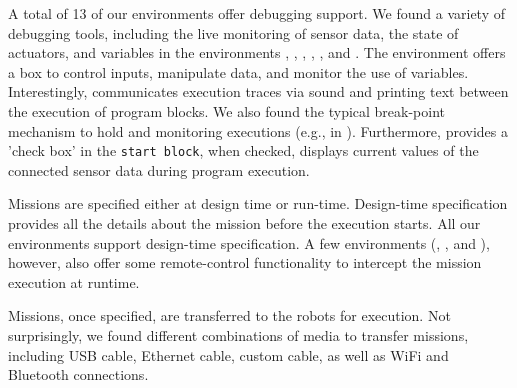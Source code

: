  A total of 13 of our environments offer debugging support. We found a variety of debugging tools, including the live monitoring of sensor data, the state of actuators, and variables in the environments \picaxe, \aseba, \trik, \flyaq, \easyc, and \edison. The environment \edison offers a box to control inputs, manipulate data, and monitor the use of variables. %
Interestingly, \makecode communicates execution traces via sound and printing text between the execution of program blocks. %
We also found the typical break-point mechanism to hold and monitoring executions (e.g., in \robotmesh).
Furthermore, \openroberta provides a 'check box' in the \texttt{start block}, when checked, displays current values of the connected sensor data during program execution. %

 Missions are specified either at design time or run-time. Design-time specification provides all the details about the mission before the execution starts.
All our environments support design-time specification. A few environments (\turtlebot, \sphero, and \choregraphe), however, also offer some remote-control functionality to intercept the mission execution at runtime. %

 Missions, once specified, are transferred to the robots for execution. Not surprisingly, we found different combinations of media to transfer missions, including USB cable, Ethernet cable, custom cable, as well as WiFi and Bluetooth connections.


